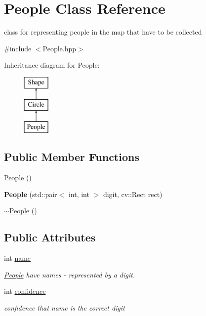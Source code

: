 \hypertarget{class_people}{}\section{People Class Reference}
\label{class_people}


class for representing people in the map that have to be collected  




{\ttfamily \#include $<$People.\+hpp$>$}

Inheritance diagram for People\+:\begin{figure}[H]
\begin{center}
\leavevmode
\includegraphics[height=3.000000cm]{class_people}
\end{center}
\end{figure}
\subsection*{Public Member Functions}
\begin{DoxyCompactItemize}
\item 
\mbox{\hyperlink{class_people_aae1408eddfd15a5007003ecdf1507941}{People}} ()
\item 
\mbox{\label{class_people_abfabd2f2e27a7aa269d404e8f27f903e}} 
{\bfseries People} (std\+::pair$<$ int, int $>$ digit, cv\+::\+Rect rect)
\item 
\mbox{\hyperlink{class_people_adae124857f64dadff4e1801410b3dab2}{$\sim$\+People}} ()
\end{DoxyCompactItemize}
\subsection*{Public Attributes}
\begin{DoxyCompactItemize}
\item 
\mbox{\label{class_people_a06e995c8c3b9808db931bedb44d782c8}} 
int \mbox{\hyperlink{class_people_a06e995c8c3b9808db931bedb44d782c8}{name}}
\begin{DoxyCompactList}\small\item\em \mbox{\hyperlink{class_people}{People}} have names -\/ represented by a digit. \end{DoxyCompactList}\item 
\mbox{\label{class_people_a44d79c52132068763c91e308e9685e06}} 
int \mbox{\hyperlink{class_people_a44d79c52132068763c91e308e9685e06}{confidence}}
\begin{DoxyCompactList}\small\item\em confidence that name is the correct digit \end{DoxyCompactList}\end{DoxyCompactItemize}


